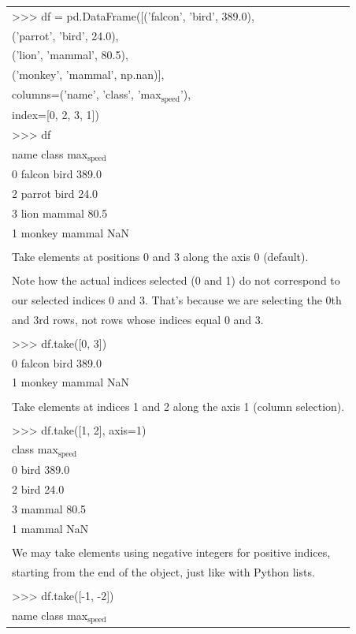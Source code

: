 \documentclass[11pt]{article}
\begin{document}
\begin{enumerate}
\begin{enumerate}
\begin{enumerate}
\begin{center}
\begin{tabular}{l}
>>> df = pd.DataFrame([('falcon', 'bird',    389.0),\\
('parrot', 'bird',     24.0),\\
('lion',   'mammal',   80.5),\\
('monkey', 'mammal', np.nan)],\\
columns=('name', 'class', 'max\(_{\text{speed}}\)'),\\
index=[0, 2, 3, 1])\\
>>> df\\
name   class  max\(_{\text{speed}}\)\\
0  falcon    bird      389.0\\
2  parrot    bird       24.0\\
3    lion  mammal       80.5\\
1  monkey  mammal        NaN\\
\\
Take elements at positions 0 and 3 along the axis 0 (default).\\
\\
Note how the actual indices selected (0 and 1) do not correspond to\\
our selected indices 0 and 3. That's because we are selecting the 0th\\
and 3rd rows, not rows whose indices equal 0 and 3.\\
\\
>>> df.take([0, 3])\\
0  falcon    bird      389.0\\
1  monkey  mammal        NaN\\
\\
Take elements at indices 1 and 2 along the axis 1 (column selection).\\
\\
>>> df.take([1, 2], axis=1)\\
class  max\(_{\text{speed}}\)\\
0    bird      389.0\\
2    bird       24.0\\
3  mammal       80.5\\
1  mammal        NaN\\
\\
We may take elements using negative integers for positive indices,\\
starting from the end of the object, just like with Python lists.\\
\\
>>> df.take([-1, -2])\\
name   class  max\(_{\text{speed}}\)\\

\end{tabular}
\end{center}
\end{enumerate}
\end{enumerate}
\end{enumerate}
\end{document}
